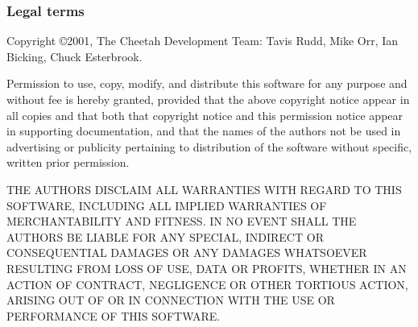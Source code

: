 \subsubsection{Legal terms}
Copyright \copyright 2001, The Cheetah Development Team: Tavis Rudd, Mike Orr,
Ian Bicking, Chuck Esterbrook.

Permission to use, copy, modify, and distribute this software for any purpose
and without fee is hereby granted, provided that the above copyright notice
appear in all copies and that both that copyright notice and this permission
notice appear in supporting documentation, and that the names of the authors not
be used in advertising or publicity pertaining to distribution of the software
without specific, written prior permission.

THE AUTHORS DISCLAIM ALL WARRANTIES WITH REGARD TO THIS SOFTWARE, INCLUDING ALL
IMPLIED WARRANTIES OF MERCHANTABILITY AND FITNESS. IN NO EVENT SHALL THE AUTHORS
BE LIABLE FOR ANY SPECIAL, INDIRECT OR CONSEQUENTIAL DAMAGES OR ANY DAMAGES
WHATSOEVER RESULTING FROM LOSS OF USE, DATA OR PROFITS, WHETHER IN AN ACTION OF
CONTRACT, NEGLIGENCE OR OTHER TORTIOUS ACTION, ARISING OUT OF OR IN CONNECTION
WITH THE USE OR PERFORMANCE OF THIS SOFTWARE.

